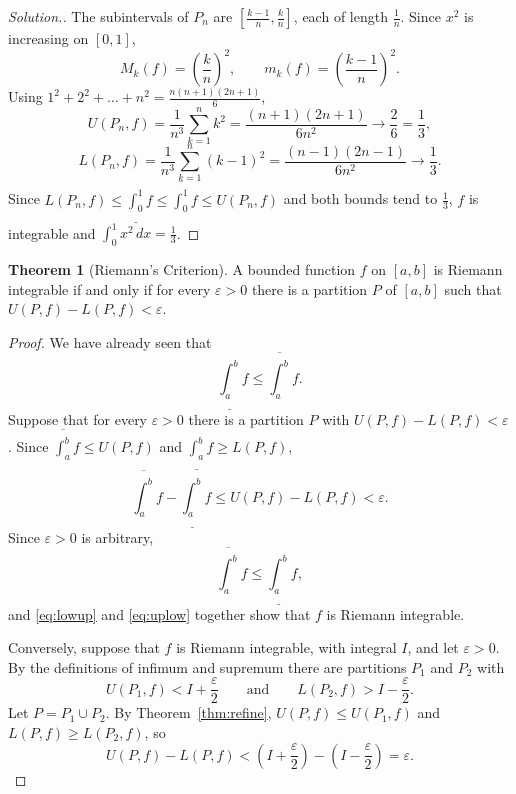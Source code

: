 \documentclass[11pt,a4paper]{article}
\numberwithin{equation}{section}
\theoremstyle{definition}
\newtheorem{thm}{Theorem}[subsection]
\newenvironment{solution}
  {\renewcommand{\qedsymbol}{}\begin{proof}[\textit{Solution}.]}
  {\end{proof}}
\begin{document}
\begin{solution}
The subintervals of $P_n$ are $\left[\frac{k-1}{n},\frac{k}{n}\right]$, each of length $\frac{1}{n}$. Since $x^2$ is increasing on $[0,1]$,
$$M_k(f) = \left(\frac{k}{n}\right)^2,\qquad m_k (f) = \left(\frac{k - 1}{n}\right)^2 .$$
Using $1^2 + 2^2 + \dots + n^2 = \frac{n(n + 1)(2n + 1)}{6}$,
$$U(P_n,f) = \frac{1}{n^3}\sum^n_{k = 1}k^2 = \frac{(n + 1)(2n + 1)}{6n^2}\longrightarrow\frac{2}{6} = \frac{1}{3},$$
$$L(P_n,f) = \frac{1}{n^3}\sum^n_{k = 1}(k-1)^2 = \frac{(n - 1)(2n - 1)}{6n^2} \longrightarrow \frac{1}{3} .$$
Since $L(P_n, f) \leq \underline{\int^1_0} f \leq \overline{\int^1_0} f \leq U(P_n, f)$ and both bounds tend to $\frac{1}{3}$, $f$ is integrable and $\int^1_0 x^2\, dx = \frac{1}{3}$.
\end{solution}


\begin{thm}[Riemann's Criterion]\label{thm:riemanncrit}
A bounded function $f$ on $[a,b]$ is Riemann integrable if and only if for every $\varepsilon >0$ there is a partition $P$ of $[a,b]$ such that $U(P, f) - L(P,f) < \varepsilon$.
\end{thm}

\begin{proof}
We have already seen that
\begin{equation}\label{eq:lowup}
\underline{\int^b_a} f \leq \overline{\int^b_a} f .
\end{equation}
Suppose that for every $\varepsilon > 0$ there is a partition $P$ with $U(P,f) - L(P, f) < \varepsilon$. Since $\overline{\int^b_a} f \leq U(P,f)$ and $\underline{\int^b_a} f \geq L(P,f)$,
$$\overline{\int^b_a}f - \underline{\int^b_a}f \leq U(P,f) - L(P,f) < \varepsilon .$$
Since $\varepsilon  > 0$ is arbitrary,
\begin{equation}\label{eq:uplow}
\overline{\int^b_a}f \leq \underline{\int^b_a}f ,
\end{equation}
and \eqref{eq:lowup} and \eqref{eq:uplow} together show that $f$ is Riemann integrable.

Conversely, suppose that $f$ is Riemann integrable, with integral $I$, and let $\varepsilon >  0$. By the definitions of infimum and supremum there are partitions $P_1$ and $P_2$ with
$$U(P_1,f) < I + \frac{\varepsilon}{2} \qquad\text{and}\qquad L(P_2,f) > I - \frac{\varepsilon}{2}.$$
Let $P = P_1\cup P_2$. By Theorem~\ref{thm:refine}, $U(P,f)\leq U(P_1,f)$ and $L(P,f)\geq L(P_2,f)$, so
$$U(P,f) - L(P,f) < \left(I + \frac{\varepsilon}{2}\right) - \left(I - \frac{\varepsilon}{2}\right) = \varepsilon .$$
\end{proof}
\end{document}

